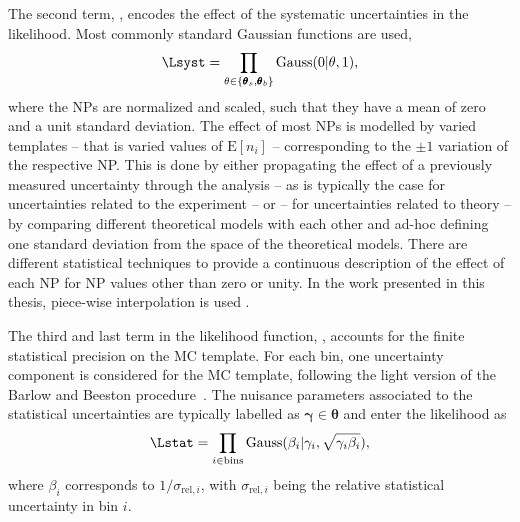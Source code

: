 The second term, \Lsyst, encodes the effect of the systematic uncertainties in the likelihood. Most commonly standard Gaussian functions are used,
\begin{equation}
    \Lsyst = \prod_{\theta \in \{ \pmb{\theta}_s,\pmb{\theta}_b \}} \text{Gauss}(0 | \theta, 1),
\end{equation}
where the NPs are normalized and scaled, such that they have a mean of zero and a unit standard deviation.
The effect of most NPs is modelled by varied templates -- that is varied values of $\text{E}[n_i]$ -- corresponding to the $\pm 1$ variation of the respective NP. This is done by either propagating the effect of a previously measured uncertainty through the analysis -- as is typically the case for uncertainties related to the experiment -- or -- for uncertainties related to theory -- by comparing different theoretical models with each other and ad-hoc defining one standard deviation from the space of the theoretical models.
There are different statistical techniques to provide a continuous description of the effect of each NP for NP values other than zero or unity.
In the work presented in this thesis, piece-wise interpolation is used .

The third and last term in the likelihood function, \Lstat, 
accounts for the finite statistical precision on the MC template. For each bin, one uncertainty component is considered for the MC template, following the light version of the Barlow and Beeston procedure~\cite{BARLOW1993219}. The nuisance parameters associated to the statistical uncertainties are typically labelled as $\pmb{\gamma} \in \pmb{\theta}$ and enter the likelihood as
\begin{equation}
    \Lstat = \prod_{i \in \text{bins}} \text{Gauss}(\beta_i | \gamma_i, \sqrt{\gamma_i \beta_i}),    
\end{equation}
where $\beta_i$ corresponds to $1 / \sigma_{\text{rel}, i}$, with $\sigma_{\text{rel}, i}$ being the relative statistical uncertainty in bin $i$. 



